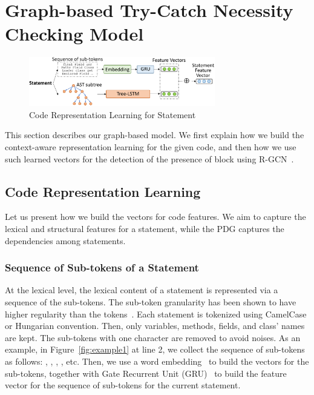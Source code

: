 \section{Graph-based Try-Catch Necessity Checking Model}
\label{detect:sec}

\begin{figure}[t]
	\centering
	\includegraphics[width=3.2in]{features.png}
        \vspace{-0.08in}
	\caption{Code Representation Learning for Statement}
	\label{fig:feature}	
\end{figure}

This section describes our graph-based {\xblock} model. We first
explain how we build the context-aware representation learning for the
given code, and then how we use such learned vectors for the detection
of the presence of  block using R-GCN~\cite{yi}.

\subsection{Code Representation Learning}
\label{replearn:sec}

Let us present how we build the vectors for code
features. We aim to capture the lexical and structural features for a
statement, while the PDG captures the dependencies among statements.

\vspace{-1pt}
\subsubsection{Sequence of Sub-tokens of a Statement}

At the lexical level, the lexical content of a statement is
represented via a sequence of the sub-tokens. The sub-token
granularity has been shown to have higher regularity than the
tokens~\cite{icse20-methodname}. Each statement is tokenized using
CamelCase or Hungarian convention. Then, only variables, methods,
fields, and class' names are kept. The sub-tokens with one character
are removed to avoid noises. As an example, in
Figure~\ref{fig:example1} at line 2, we collect the sequence of
sub-tokens as follows: , , ,
, etc. Then, we use a word embedding~\cite{glove2014} to
build the vectors for the sub-tokens, together with Gate Recurrent
Unit (GRU)~\cite{chung2014empirical} to build the feature vector for
the sequence of sub-tokens for the current statement.

